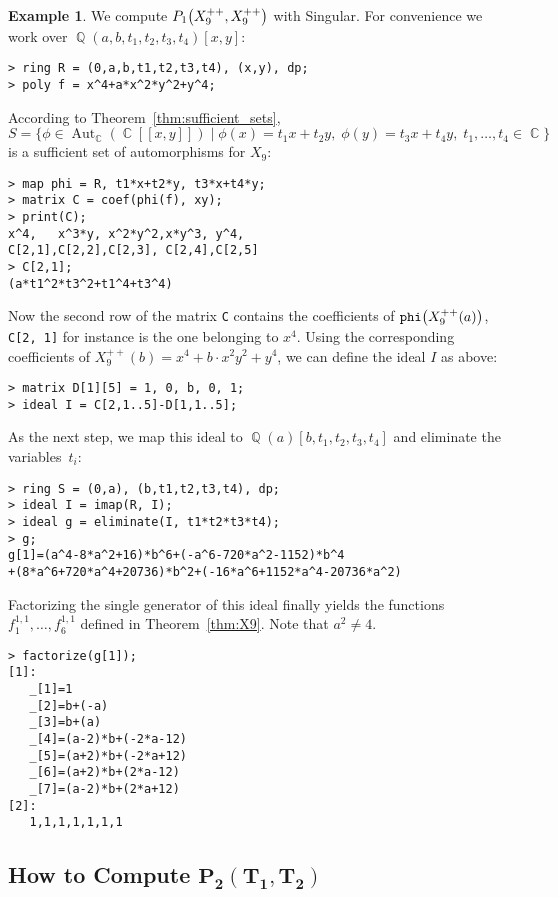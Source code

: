 \documentclass{amsproc}
\theoremstyle{definition}
\newtheorem{example}[theorem]{Example}
\let\originalleft\left
\let\originalright\right
\renewcommand{\left}{\mathopen{}\mathclose\bgroup\originalleft}
\renewcommand{\right}{\aftergroup\egroup\originalright}
\DeclareMathOperator{\Q}{\mathbb{Q}}
\DeclareMathOperator{\C}{\mathbb{C}}
\DeclareMathOperator{\Aut}{Aut}
\begin{document}
\begin{example}\label{ex:P1}
We compute $P_1\left(X_9^{++}, X_9^{++}\right)$ with Singular. For convenience
we work over $\Q(a,b,t_1,t_2,t_3,t_4)[x,y]$:
\begin{verbatim}
> ring R = (0,a,b,t1,t2,t3,t4), (x,y), dp;
> poly f = x^4+a*x^2*y^2+y^4;
\end{verbatim}
According to Theorem~\ref{thm:sufficient_sets},
\[
S = \bigl\{ \phi \in \Aut_{\C}(\C[[x,y]])
\mid \phi(x) = t_1 x + t_2 y,\; \phi(y) = t_3 x + t_4 y,\;
t_1, \ldots, t_4 \in \C \bigr\}
\]
is a sufficient set of automorphisms for $X_9$:
\begin{verbatim}
> map phi = R, t1*x+t2*y, t3*x+t4*y;
> matrix C = coef(phi(f), xy);
> print(C);
x^4,   x^3*y, x^2*y^2,x*y^3, y^4,  
C[2,1],C[2,2],C[2,3], C[2,4],C[2,5]
> C[2,1];
(a*t1^2*t3^2+t1^4+t3^4)
\end{verbatim}
Now the second row of the matrix \verb+C+ contains the coefficients of
$\verb+phi+\left(X_9^{++}(a)\right)$, \verb+C[2, 1]+ for instance is the one
belonging to $x^4$. Using the corresponding coefficients of
$X_9^{++}(b) = x^4 + b \cdot x^2 y^2 + y^4$, we can define the ideal $I$ as
above:
\begin{verbatim}
> matrix D[1][5] = 1, 0, b, 0, 1;
> ideal I = C[2,1..5]-D[1,1..5];
\end{verbatim}
As the next step, we map this ideal to $\Q(a)[b,t_1,t_2,t_3,t_4]$ and eliminate
the variables~$t_i$:
\begin{verbatim}
> ring S = (0,a), (b,t1,t2,t3,t4), dp;
> ideal I = imap(R, I);
> ideal g = eliminate(I, t1*t2*t3*t4);
> g;
g[1]=(a^4-8*a^2+16)*b^6+(-a^6-720*a^2-1152)*b^4
+(8*a^6+720*a^4+20736)*b^2+(-16*a^6+1152*a^4-20736*a^2)
\end{verbatim}
Factorizing the single generator of this ideal finally yields the functions
$f_1^{1,1}, \ldots, f_6^{1,1}$ defined in Theorem~\ref{thm:X9}. Note that
$a^2 \neq 4$.
\begin{verbatim}
> factorize(g[1]);
[1]:
   _[1]=1
   _[2]=b+(-a)
   _[3]=b+(a)
   _[4]=(a-2)*b+(-2*a-12)
   _[5]=(a+2)*b+(-2*a+12)
   _[6]=(a+2)*b+(2*a-12)
   _[7]=(a-2)*b+(2*a+12)
[2]:
   1,1,1,1,1,1,1
\end{verbatim}
\end{example}


\subsection{How to Compute $\boldsymbol{P_2(T_1, T_2)}$}%
\label{ssec:computing_P2}
\end{document}
